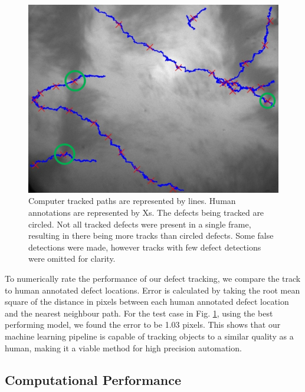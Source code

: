 \documentclass[prl,reprint,showpacs,floatfix,nofootinbib]{revtex4-1}
\begin{document}
\begin{figure}
  \includegraphics[width=\linewidth]{circleTrack.jpg}
  \caption{Computer tracked paths are represented by lines. Human annotations are represented by Xs. The defects being tracked are circled. Not all tracked defects were present in a single frame, resulting in there being more tracks than circled defects. Some false detections were made, however tracks with few defect detections were omitted for clarity. }
  \label{fig:tracks} 
\end{figure}

To numerically rate the performance of our defect tracking, we compare the track to human annotated defect locations. Error is calculated by taking the root mean square of the distance in pixels between each human annotated defect location and the nearest neighbour path. For the test case in Fig. \ref{fig:tracks}, using the best performing model, we found the error to be 1.03 pixels. This shows that our machine learning pipeline is capable of tracking objects to a similar quality as a human, making it a viable method for high precision automation.

\subsection{Computational Performance}
\end{document}
